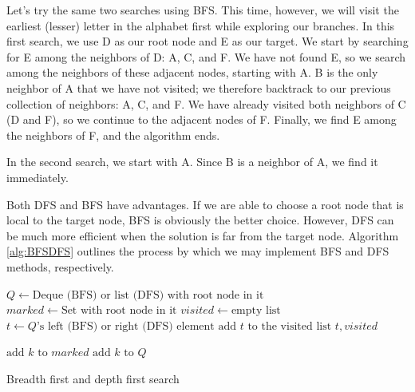 Let's try the same two searches using BFS. This time, however, we will visit the earliest (lesser) letter in the alphabet first while exploring our branches.
In this first search, we use D as our root node and E as our target.
We start by searching for E among the neighbors of D: A, C, and F.
We have not found E, so we search among the neighbors of these adjacent nodes, starting with A.
B is the only neighbor of A that we have not visited; we therefore backtrack to our previous collection of neighbors: A, C, and F.
We have already visited both neighbors of C (D and F), so we continue to the adjacent nodes of F. Finally, we find E among the neighbors of F, and the algorithm ends.

In the second search, we start with A.
Since B is a neighbor of A, we find it immediately.

Both DFS and BFS have advantages.
If we are able to choose a root node that is local to the target node, BFS is obviously the better choice. However, DFS can be much more efficient when the solution is far from the target node. Algorithm \ref{alg:BFSDFS} outlines the process by which we may implement BFS and DFS methods, respectively.

\begin{algorithm}
\begin{algorithmic}[1]
	\State $Q \gets \text{Deque (BFS) or list (DFS) with root node in it}$	
	\State $marked \gets \text{Set with root node in it}$	
	\State $visited \gets \text{empty list}$	
							
		\State $t \gets Q\text{'s left (BFS) or right (DFS) element}$	
		\State $\text{add }t \text{ to the visited list}$
									
			\State {} $t,visited$
		
		\Else										{}
					\State $\text{add } k \text{ to } marked$
					\State $\text{add } k \text{ to } Q$
				\EndIf
			\EndFor
		\EndIf
	\EndWhile
\EndProcedure
\end{algorithmic}
\caption{Breadth first and depth first search}
\label{alg:BFSDFS}
\end{algorithm}

